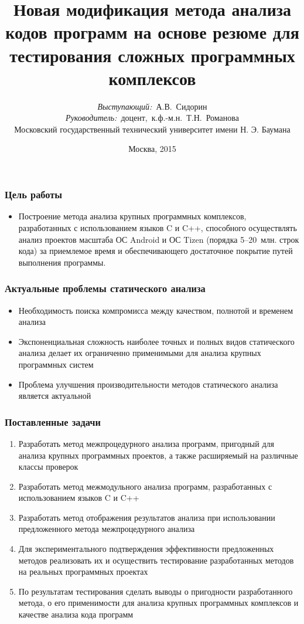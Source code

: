 \documentclass[14pt]{beamer}
\title{\small{Новая модификация метода анализа кодов программ на основе резюме для тестирования сложных программных комплексов}}
\author{\small{%
\emph{Выступающий:}~А.В.~Сидорин\\%
\emph{Руководитель:}~доцент,~к.ф.-м.н.~Т.Н.~Романова}\\%
\vspace{30pt}%
Московский государственный технический университет имени Н. Э. Баумана%
\vspace{20pt}%
}
\date{\small{Москва, 2015}}
\begin{document}
\maketitle

\begin{frame}
\frametitle{Цель работы}
\begin{itemize}
  \item Построение метода анализа крупных программных комплексов, разработанных с использованием языков C и C++, способного осуществлять анализ проектов масштаба ОС Android и ОС Tizen (порядка 5--20~млн. строк кода) за приемлемое время и обеспечивающего достаточное покрытие путей выполнения программы.
\end{itemize}
\end{frame}

\begin{frame}
\frametitle{Актуальные проблемы статического анализа}
\begin{itemize}
  \item Необходимость поиска компромисса между качеством, полнотой и временем анализа
  \item Экспоненциальная сложность наиболее точных и полных видов статического анализа делает их ограниченно применимыми для анализа крупных программных систем
  \item Проблема улучшения производительности методов статического анализа является актуальной   
\end{itemize}
\end{frame}

\begin{frame}[allowframebreaks]
\frametitle{Поставленные задачи}
\begin{enumerate}
  \item Разработать метод межпроцедурного анализа программ, пригодный для анализа крупных программных проектов, а также расширяемый на различные классы проверок
  \item Разработать метод межмодульного анализа программ, разработанных с использованием языков C и C++
  \item Разработать метод отображения результатов анализа при использовании предложенного метода межпроцедурного анализа
  \item Для экспериментального подтверждения эффективности предложенных методов реализовать их и осуществить тестирование разработанных методов на реальных программных проектах
  \item По результатам тестирования сделать выводы о пригодности разработанного метода, о его применимости для анализа крупных программных комплексов и качестве анализа кода программ
\end{enumerate}
\end{frame}
\end{document}
